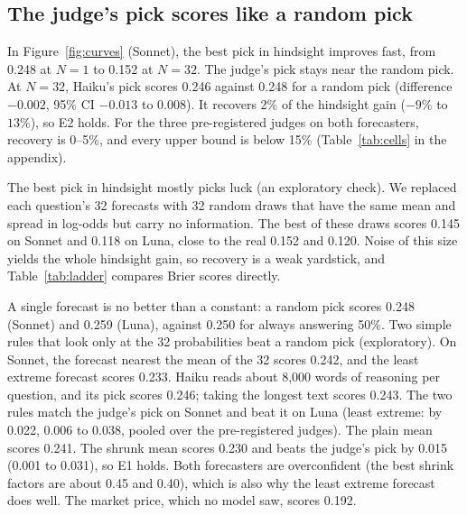 \documentclass[letterpaper]{article} %
\begin{document}
\subsection{The judge's pick scores like a random pick}\label{sec:pick}
In Figure~\ref{fig:curves} (Sonnet), the best pick in hindsight improves fast, from 0.248 at $N = 1$ to 0.152 at $N = 32$. The judge's pick stays near the random pick. At $N = 32$, Haiku's pick scores 0.246 against 0.248 for a random pick (difference $-0.002$, 95\% CI $-0.013$ to $0.008$). It recovers 2\% of the hindsight gain ($-9\%$ to $13\%$), so E2 holds. For the three pre-registered judges on both forecasters, recovery is 0--5\%, and every upper bound is below 15\% (Table~\ref{tab:cells} in the appendix).

The best pick in hindsight mostly picks luck (an exploratory check). We replaced each question's 32 forecasts with 32 random draws that have the same mean and spread in log-odds but carry no information. The best of these draws scores 0.145 on Sonnet and 0.118 on Luna, close to the real 0.152 and 0.120. Noise of this size yields the whole hindsight gain, so recovery is a weak yardstick, and Table~\ref{tab:ladder} compares Brier scores directly.

A single forecast is no better than a constant: a random pick scores 0.248 (Sonnet) and 0.259 (Luna), against 0.250 for always answering 50\%. Two simple rules that look only at the 32 probabilities beat a random pick (exploratory). On Sonnet, the forecast nearest the mean of the 32 scores 0.242, and the least extreme forecast scores 0.233. Haiku reads about 8,000 words of reasoning per question, and its pick scores 0.246; taking the longest text scores 0.243. The two rules match the judge's pick on Sonnet and beat it on Luna (least extreme: by 0.022, 0.006 to 0.038, pooled over the pre-registered judges). The plain mean scores 0.241. The shrunk mean scores 0.230 and beats the judge's pick by 0.015 (0.001 to 0.031), so E1 holds. Both forecasters are overconfident (the best shrink factors are about 0.45 and 0.40), which is also why the least extreme forecast does well. The market price, which no model saw, scores 0.192.
\end{document}
